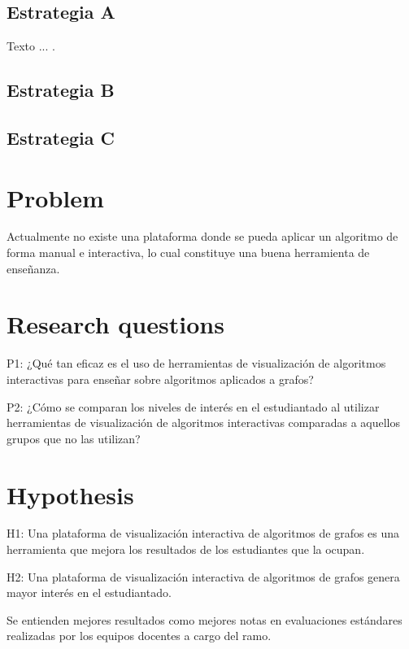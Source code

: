 \documentclass[submission]{eptcs}
\begin{document}
\subsection{ Estrategia A}

Texto ...  \cite{hopper2001empirical}. \\


\subsection{ Estrategia B}


\subsection{ Estrategia C}


\section{Problem}

Actualmente no existe una plataforma donde se pueda aplicar
un algoritmo de forma manual e interactiva, lo cual constituye
una buena herramienta de enseñanza. 


\section{Research questions}

P1: ¿Qué tan eficaz es el uso de herramientas de visualización de algoritmos interactivas para
enseñar sobre algoritmos aplicados a grafos?

P2: ¿Cómo se comparan los niveles de interés en el estudiantado al utilizar herramientas
de visualización de algoritmos interactivas comparadas a aquellos grupos que no las utilizan?


\section{Hypothesis}

H1: Una plataforma de visualización interactiva de algoritmos de grafos
es una herramienta que mejora los resultados de los estudiantes que la ocupan.

H2: Una plataforma de visualización interactiva de algoritmos de grafos
genera mayor interés en el estudiantado.

Se entienden mejores resultados como mejores notas en evaluaciones estándares
realizadas por los equipos docentes a cargo del ramo.
\end{document}
